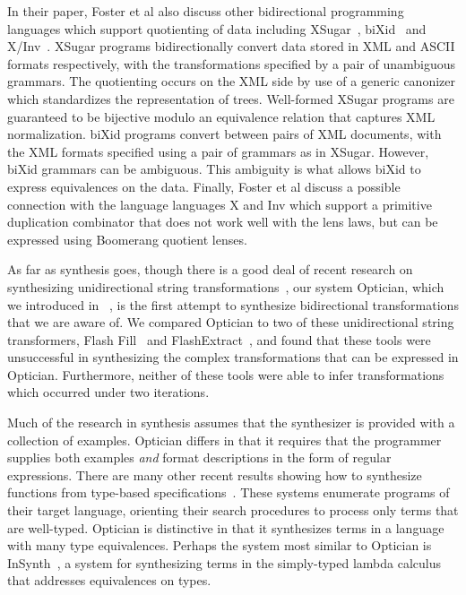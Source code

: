 \documentclass{svproc}
\begin{document}
In their paper, Foster et al also discuss other bidirectional programming
languages which support quotienting of data including XSugar~\cite{xsugar},
biXid~\cite{bixid} and X/Inv~\cite{xinv}. XSugar programs bidirectionally
convert data stored in XML and ASCII formats respectively, with the
transformations specified by a pair of unambiguous grammars. The quotienting
occurs on the XML side by use of a generic canonizer which standardizes the
representation of trees. Well-formed XSugar programs are guaranteed to be
bijective modulo an equivalence relation that captures XML normalization. biXid
programs convert between pairs of XML documents, with the XML formats specified
using a pair of grammars as in XSugar. However, biXid grammars can be ambiguous.
This ambiguity is what allows biXid to express equivalences on the data.
Finally, Foster et al discuss a possible connection with the language languages
X and Inv which support a primitive duplication combinator that does not work
well with the lens laws, but can be expressed using Boomerang quotient lenses.

As far as synthesis goes, though there is a good deal of recent research on
synthesizing unidirectional string
transformations~\cite{singh2012learning,le-pldi-2014,gulwani-popl-2014,
perelman2014test,Singh:blinkfill}, our system Optician, which we introduced in
~\cite{popl18}, is the first attempt to synthesize bidirectional
transformations that we are aware of. We compared Optician to two of these
unidirectional string transformers, Flash Fill~\cite{gulwani-popl-2014} and
FlashExtract~\cite{le-pldi-2014}, and found that these tools were unsuccessful
in synthesizing the complex transformations that can be expressed in Optician.
Furthermore, neither of these tools were able to infer transformations 
which occurred under two iterations.

Much of the research in synthesis assumes that the synthesizer is provided with
a collection of examples. Optician differs in that it requires that the
programmer supplies both examples {\em and} format descriptions in the form of
regular expressions. There are many other recent results showing how to
synthesize functions from type-based
specifications~\cite{augustsson-2004,osera+:pldi15,
feser-pldi-2015,scherer-icfp-2015,frankle+:popl16,armando+:pldi16}.
These systems enumerate programs of their target language, orienting their
search procedures to process only terms that are well-typed.
Optician is distinctive in that it synthesizes terms in a language with many
type equivalences. 
Perhaps the system most similar to Optician is InSynth~\cite{gvero-pldi-2013}, a
system for synthesizing terms in the simply-typed lambda calculus that addresses
equivalences on types.  
\end{document}
